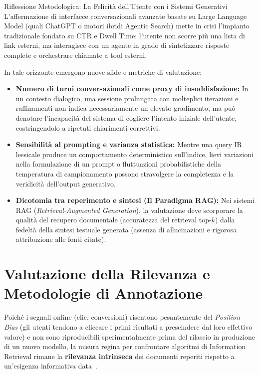 \begin{alertblock}{Riflessione Metodologica: La Felicit\`a dell'Utente con i Sistemi Generativi}
L'affermazione di interfacce conversazionali avanzate basate su Large Language Model (quali ChatGPT o motori ibridi Agentic Search) mette in crisi l'impianto tradizionale fondato su CTR e Dwell Time: l'utente non scorre pi\`u una lista di link esterni, ma interagisce con un agente in grado di sintetizzare risposte complete e orchestrare chiamate a tool esterni.

In tale orizzonte emergono nuove sfide e metriche di valutazione:
\begin{itemize}
    \item \textbf{Numero di turni conversazionali come proxy di insoddisfazione:} In un contesto dialogico, una sessione prolungata con molteplici iterazioni e raffinamenti non indica necessariamente un elevato gradimento, ma pu\`o denotare l'incapacit\`a del sistema di cogliere l'intento iniziale dell'utente, costringendolo a ripetuti chiarimenti correttivi.
    \item \textbf{Sensibilit\`a al prompting e varianza statistica:} Mentre una query IR lessicale produce un comportamento deterministico sull'indice, lievi variazioni nella formulazione di un prompt o fluttuazioni probabilistiche della temperatura di campionamento possono stravolgere la completezza e la veridicit\`a dell'output generativo.
    \item \textbf{Dicotomia tra reperimento e sintesi (Il Paradigma RAG):} Nei sistemi RAG (\textit{Retrieval-Augmented Generation}), la valutazione deve scorporare la qualit\`a del recupero documentale (accuratezza del retrieval top-$k$) dalla fedelt\`a della sintesi testuale generata (assenza di allucinazioni e rigorosa attribuzione alle fonti citate).
\end{itemize}
\end{alertblock}

\FloatBarrier
\section{Valutazione della Rilevanza e Metodologie di Annotazione}
\label{sec:rilevanza-annotazione}

Poiché i segnali online (clic, conversioni) risentono pesantemente del \textit{Position Bias} (gli utenti tendono a cliccare i primi risultati a prescindere dal loro effettivo valore) e non sono riproducibili sperimentalmente prima del rilascio in produzione di un nuovo modello, la misura regina per confrontare algoritmi di Information Retrieval rimane la \textbf{rilevanza intrinseca} dei documenti reperiti rispetto a un'esigenza informativa data~\cite{manning2008}.

